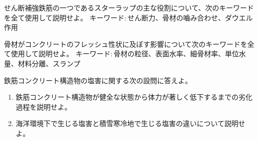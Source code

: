せん断補強鉄筋の一つであるスターラップの主な役割について、次のキーワードを全て使用して説明せよ。
キーワード$\colon$せん断力、骨材の嚙み合わせ、ダウエル作用

骨材がコンクリートのフレッシュ性状に及ぼす影響について次のキーワードを全て使用して説明せよ。
キーワード$\colon$骨材の粒径、表面水率、細骨材率、単位水量、材料分離、スランプ

鉄筋コンクリート構造物の塩害に関する次の設問に答えよ。
\begin{enumerate}[(1)]
  \item 鉄筋コンクリート構造物が健全な状態から体力が著しく低下するまでの劣化過程を説明せよ。
  \item 海洋環境下で生じる塩害と積雪寒冷地で生じる塩害の違いについて説明せよ。
\end{enumerate}